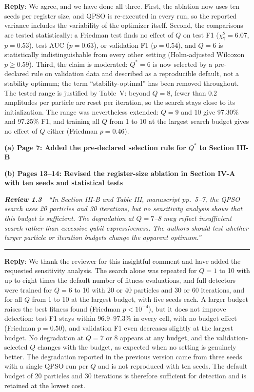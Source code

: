 \documentclass[11pt]{article}
\newcommand{\review}[2]{\par\bigskip\noindent\textbf{\textit{Review #1}}\ \ \textit{``#2''}\par\smallskip\hrule\medskip}
\newcommand{\reply}{\noindent\textbf{Reply}: }
\newcommand{\loc}[1]{\par\medskip\noindent\textbf{#1}\par}
\begin{document}
\reply We agree, and we have done all three. First, the ablation now uses
ten seeds per register size, and QPSO is re-executed in every run, so the
reported variance includes the variability of the optimizer itself. Second,
the comparisons are tested statistically: a Friedman test finds no effect of
$Q$ on test F1 ($\chi^2_7=6.07$, $p=0.53$), test AUC ($p=0.63$), or
validation F1 ($p=0.54$), and $Q=6$ is statistically indistinguishable from
every other setting (Holm-adjusted Wilcoxon $p\ge0.59$). Third, the claim is
moderated: $Q^{*}=6$ is now selected by a pre-declared rule on validation
data and described as a reproducible default, not a stability optimum; the
term ``stability-optimal'' has been removed throughout. The tested range is
justified by Table~V: beyond $Q=8$, fewer than 0.2 amplitudes per particle
are reset per iteration, so the search stays close to its initialization.
The range was nevertheless extended: $Q=9$ and 10 give 97.30\% and 97.25\%
F1, and training all $Q$ from 1 to 10 at the largest search budget gives no
effect of $Q$ either (Friedman $p=0.46$).

\loc{(a) Page 7: Added the pre-declared selection rule for $Q^{*}$ to Section III-B}

\loc{(b) Pages 13--14: Revised the register-size ablation in Section IV-A with ten seeds and statistical tests}

\review{1.3}{In Section III-B and Table III, manuscript pp.~5--7, the QPSO search uses 20 particles and 30 iterations, but no sensitivity analysis shows that this budget is sufficient. The degradation at $Q=7$--8 may reflect insufficient search rather than excessive qubit expressiveness. The authors should test whether larger particle or iteration budgets change the apparent optimum.}

\reply We thank the reviewer for this insightful comment and have added the
requested sensitivity analysis. The search alone was repeated for $Q=1$ to 10
with up to eight times the default number of fitness evaluations, and full
detectors were trained for $Q=6$ to 10 with 20 or 40 particles and 30 or 60
iterations, and for all $Q$ from 1 to 10 at the largest budget, with five
seeds each. A larger budget raises the best fitness found (Friedman
$p<10^{-4}$), but it does not improve detection: test F1 stays within
96.9--97.3\% in every cell, with no budget effect (Friedman $p=0.50$), and
validation F1 even decreases slightly at the largest budget. No degradation
at $Q=7$ or 8 appears at any budget, and the validation-selected $Q$ changes
with the budget, as expected when no setting is genuinely better. The
degradation reported in the previous version came from three seeds with a
single QPSO run per $Q$ and is not reproduced with ten seeds. The default
budget of 20 particles and 30 iterations is therefore sufficient for
detection and is retained at the lowest cost.
\end{document}
